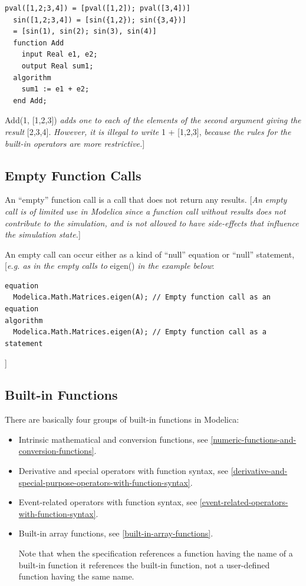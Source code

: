 \documentclass[10pt,a4paper]{report}
\def\doublelabel#1{\label{#1}\hypertarget{#1}{}}
\begin{document}
\begin{lstlisting}[language=modelica]
  pval([1,2;3,4]) = [pval([1,2]); pval([3,4])]
  sin([1,2;3,4]) = [sin({1,2}); sin({3,4})]
  = [sin(1), sin(2); sin(3), sin(4)]
  function Add
    input Real e1, e2;
    output Real sum1;
  algorithm
    sum1 := e1 + e2;
  end Add;
\end{lstlisting}
Add(1, {[}1,2,3{]}) \emph{adds one to each of the elements of the second
argument giving the result} {[}2,3,4{]}. \emph{However, it is illegal to
write} 1 + {[}1,2,3{]}, \emph{because the rules for the built-in
operators are more restrictive.}{]}

\subsection{Empty Function Calls}\doublelabel{empty-function-calls}

An ``empty'' function call is a call that does not return any results.
{[}\emph{An empty call is of limited use in Modelica since a function
call without results does not contribute to the simulation, and is not
allowed to have side-effects that influence the simulation state.}{]}

An empty call can occur either as a kind of ``null'' equation or
``null'' statement, {[}\emph{e.g. as in the empty calls to} eigen()
\emph{in the example below}:

\begin{lstlisting}[language=modelica]
equation
  Modelica.Math.Matrices.eigen(A); // Empty function call as an equation
algorithm
  Modelica.Math.Matrices.eigen(A); // Empty function call as a statement
\end{lstlisting}
{]}

\subsection{Built-in Functions}\doublelabel{built-in-functions}

There are basically four groups of built-in functions in Modelica:

\begin{itemize}
\item
  Intrinsic mathematical and conversion functions, see \ref{numeric-functions-and-conversion-functions}.
\end{itemize}

\begin{itemize}
\item
  Derivative and special operators with function syntax, 
  see \ref{derivative-and-special-purpose-operators-with-function-syntax}.
\item
  Event-related operators with function syntax, see \ref{event-related-operators-with-function-syntax}.
\item
  Built-in array functions, see \ref{built-in-array-functions}.

  Note that when the specification references a function having the name
  of a built-in function it references the built-in function, not a
  user-defined function having the same name.
\end{itemize}
\end{document}
